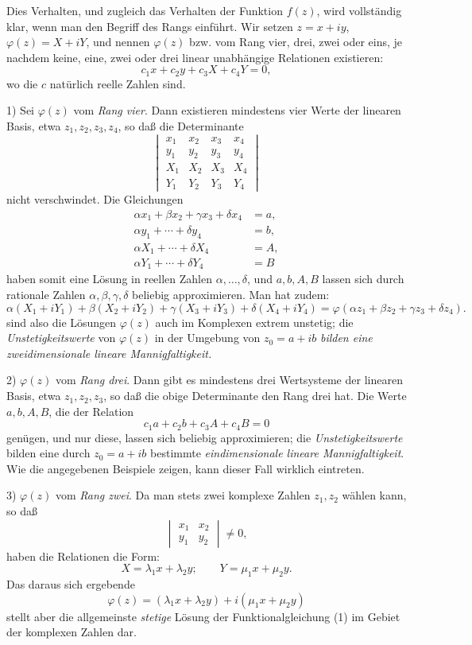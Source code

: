 Dies Verhalten, und zugleich das Verhalten der Funktion \(f(z)\), wird vollständig klar, wenn man den Begriff des Rangs einführt. Wir setzen \(z=x+iy\), \(\varphi(z)=X+iY\), und nennen \(\varphi(z)\) bzw. vom Rang vier, drei, zwei oder eins, je nachdem keine, eine, zwei oder drei linear unabhängige Relationen existieren:
\[
c_1x+c_2y+c_3X+c_4Y=0,
\]
wo die \(c\) natürlich reelle Zahlen sind.

1) Sei \(\varphi(z)\) vom \emph{Rang vier}. Dann existieren mindestens vier Werte der linearen Basis, etwa \(z_1,z_2,z_3,z_4\), so daß die Determinante
\[
\begin{vmatrix}
x_1&x_2&x_3&x_4\\
y_1&y_2&y_3&y_4\\
X_1&X_2&X_3&X_4\\
Y_1&Y_2&Y_3&Y_4
\end{vmatrix}
\]
nicht verschwindet. Die Gleichungen
\[
\begin{aligned}
\alpha x_1+\beta x_2+\gamma x_3+\delta x_4&=a,\\
\alpha y_1+\cdots+\delta y_4&=b,\\
\alpha X_1+\cdots+\delta X_4&=A,\\
\alpha Y_1+\cdots+\delta Y_4&=B
\end{aligned}
\]
haben somit eine Lösung in reellen Zahlen \(\alpha,\ldots,\delta\), und \(a,b,A,B\) lassen sich durch rationale Zahlen \(\alpha,\beta,\gamma,\delta\) beliebig approximieren. Man hat zudem:
\[
\alpha(X_1+iY_1)+\beta(X_2+iY_2)+\gamma(X_3+iY_3)+\delta(X_4+iY_4)
 =\varphi(\alpha z_1+\beta z_2+\gamma z_3+\delta z_4).
\]
 sind also die Lösungen \(\varphi(z)\) auch im Komplexen extrem unstetig; die \emph{Unstetigkeitswerte} von \(\varphi(z)\) in der Umgebung von \(z_0=a+ib\) \emph{bilden eine zweidimensionale lineare Mannigfaltigkeit.}

2) \(\varphi(z)\) vom \emph{Rang drei}. Dann gibt es mindestens drei Wertsysteme der linearen Basis, etwa \(z_1,z_2,z_3\), so daß die obige Determinante den Rang drei hat. Die Werte \(a,b,A,B\), die der Relation
\[
c_1a+c_2b+c_3A+c_4B=0
\]
genügen, und nur diese, lassen sich beliebig approximieren; die \emph{Unstetigkeitswerte} bilden eine durch \(z_0=a+ib\) bestimmte \emph{eindimensionale lineare Mannigfaltigkeit}. Wie die angegebenen Beispiele zeigen, kann dieser Fall wirklich eintreten.

3) \(\varphi(z)\) vom \emph{Rang zwei}. Da man stets zwei komplexe Zahlen \(z_1,z_2\) wählen kann, so daß
\[
\begin{vmatrix}x_1&x_2\\ y_1&y_2\end{vmatrix}\ne0,
\]
haben die Relationen die Form:
\[
X=\lambda_1x+\lambda_2y;\qquad Y=\mu_1x+\mu_2y.
\]
Das daraus sich ergebende
\[
\varphi(z)=(\lambda_1x+\lambda_2y)+i(\mu_1x+\mu_2y)
\]
stellt aber die allgemeinste \emph{stetige} Lösung der Funktionalgleichung (1) im Gebiet der komplexen Zahlen dar.

